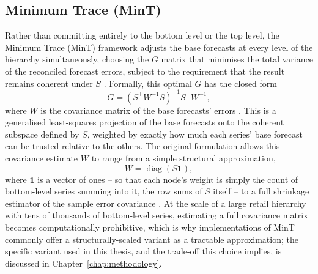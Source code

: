 \subsection{Minimum Trace (MinT)}
\label{subsec:minTrace}

Rather than committing entirely to the bottom level or the top level, the Minimum Trace (MinT) framework adjusts the base forecasts at every level of the hierarchy simultaneously, choosing the $G$ matrix that minimises the total variance of the reconciled forecast errors, subject to the requirement that the result remains coherent under $S$ \cite{Wickramasuriya:2019}. Formally, this optimal $G$ has the closed form
\[
G = \left( S^{\top} W^{-1} S \right)^{-1} S^{\top} W^{-1} ,
\]
where $W$ is the covariance matrix of the base forecasts' errors \cite{Wickramasuriya:2019}. This is a generalised least-squares projection of the base forecasts onto the coherent subspace defined by $S$, weighted by exactly how much each series' base forecast can be trusted relative to the others. The original formulation allows this covariance estimate $W$ to range from a simple structural approximation,
\[
W = \operatorname{diag}(S \mathbf{1}) ,
\]
where $\mathbf{1}$ is a vector of ones -- so that each node's weight is simply the count of bottom-level series summing into it, the row sums of $S$ itself -- to a full shrinkage estimator of the sample error covariance \cite{Wickramasuriya:2019}. At the scale of a large retail hierarchy with tens of thousands of bottom-level series, estimating a full covariance matrix becomes computationally prohibitive, which is why implementations of MinT commonly offer a structurally-scaled variant as a tractable approximation; the specific variant used in this thesis, and the trade-off this choice implies, is discussed in Chapter~\ref{chap:methodology}.

